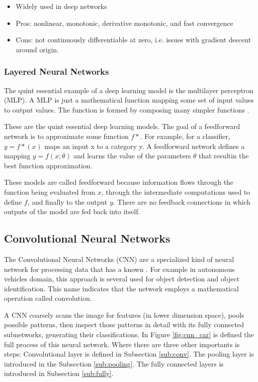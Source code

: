     \begin{itemize}
        \item Widely used in deep networks
        \item Pros: nonlinear, monotonic, derivative monotonic, and fast convergence
        \item Cons: not continuously differentiable at zero, i.e. issues with gradient descent around origin.
    \end{itemize}

\subsubsection{Layered Neural Networks}

The quint essential example of a deep learning model is the multilayer perceptron (MLP). A MLP is just a mathematical function mapping some set of input values to output values. The function
is formed by composing many simpler functions \cite{goodfellow2016deep}.


These are the quint essential deep learning models. The goal
of a feedforward network is to approximate some function $f*$. For example, for a classifier, $y = f*(x)$ maps an input x to a category y. A feedforward network
defines a mapping $y = f (x; \theta)$ and learns the value of the parameters $\theta$ that resultin the best function approximation.

These models are called feedforward because information flows through the function being evaluated from $x$, through the intermediate computations used to define $f$, and finally to the output $y$. There are no feedback connections in which outputs of the model are fed back into itself.



\subsection{Convolutional Neural Networks}


The Convolutional Neural Networks (CNN) are a specialized kind of neural network for processing data that has a known \cite{lecun1995convolutional}. For example in autonomous vehicles domain, this approach is several used for object detection and object identification. This name  indicates that the network employs a mathematical operation called
convolution. 

A CNN coarsely scans the image for features (in lower dimension space), pools possible patterns, then inspect those patterns in detail with its fully connected
subnetworks, generating their classifications. In Figure \ref{fig:cnn_car} is defined the full process of this neural network. Where there are three other importants is steps: Convolutional layer is defined in Subsection \ref{sub:conv}. The pooling layer is introduced in the Subsection \ref{sub:pooling}. The fully connected layers is introduced in Subsection \ref{sub:fully}.

